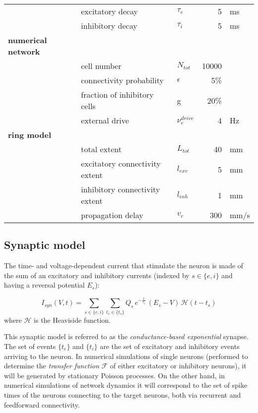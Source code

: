 \documentclass[8pt, colorlinks, a4paper]{article}
\begin{document}
\begin{table*}[tb!]
\begin{tabular}{l|l|l|r|l}
                        & excitatory decay & \(\tau_e\) & 5 & ms\\
                        & inhibitory  decay & \(\tau_i\) & 5 & ms\\
    \textbf{numerical network} &  &  &  & \\
                        & cell number & \(N_{tot}\) & 10000 & \\
                        & connectivity probability & \(\epsilon\) & 5\% & \\
                        & fraction of inhibitory cells & g & 20\% & \\
                        & external drive & \(\nu_e^{drive}\) & 4 & Hz\\
    \textbf{ring model} &  &  &  & \\
                        & total extent & \(L_{tot}\) & 40 & mm\\
                        & excitatory connectivity extent & \(l_{exc}\) & 5 & mm\\
                        & inhibitory connectivity extent & \(l_{inh}\) & 1 & mm\\
                        & propagation delay & \(v_c\) & 300 & mm/s\\
  \end{tabular}
\end{table*}

\subsection{Synaptic model}
\label{sec-3-2}

The time- and voltage-dependent current that stimulate the neuron is
made of the sum of an excitatory and inhibitory currents (indexed by
\(s \in \{e,i\}\) and having a reversal potential \(E_s\)):

\begin{equation}
  \label{eq:syn-current}
  I_{syn}(V,t) = \sum_{s \in \{e,i\}} \sum_{t_s \in \{t_s\}} Q_s \, e^{-\frac{t}{\tau_s}} \, (E_{s}-V) \, \mathcal{H}(t-t_s)
\end{equation}
where \(\mathcal{H}\) is the Heaviside function.

This synaptic model is referred to as the \emph{conductance-based
  exponential} synapse. The set of events \(\{t_e\}\) and \(\{t_i\}\)
are the set of excitatory and inhibitory events arriving to the
neuron. In numerical simulations of single neurons (performed to
determine the \textit{transfer function} \(\mathcal{F}\) of either
excitatory or inhibitory neurons), it will be generated by stationary
Poisson processes. On the other hand, in numerical simulations of
network dynamics it will correspond to the set of spike times of the
neurons connecting to the target neurons, both via recurrent and
feedforward connectivity.
\end{document}
